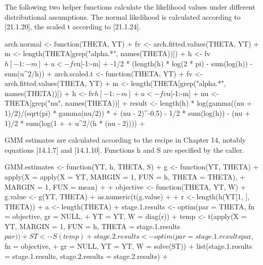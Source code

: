 \documentclass[a4paper]{article}
\begin{document}
The following two helper functions calculate the likelihood values under different distributional assumptions.
The normal likelihood is calculated according to [21.1.20], the scaled t according to [21.1.24].
\begin{Schunk}
\begin{Sinput}
 arch.normal <- function(THETA, YT) {
+     fv <- arch.fitted.values(THETA, YT)
+     m <- length(THETA[grep("alpha.*", names(THETA))])
+     h <- fv$h[-1:-m]
+     u <- fv$u[-1:-m]
+     -1/2 * (length(h) * log(2 * pi) - sum(log(h)) - sum(u^2/h))
+ }
 arch.scaled.t <- function(THETA, YT) {
+     fv <- arch.fitted.values(THETA, YT)
+     m <- length(THETA[grep("alpha.*", names(THETA))])
+     h <- fv$h[-1:-m]
+     u <- fv$u[-1:-m]
+     nu <- THETA[grep("nu", names(THETA))]
+     result <- length(h) * log(gamma((nu + 1)/2)/(sqrt(pi) * gamma(nu/2)) * 
+         (nu - 2)^-0.5) - 1/2 * sum(log(h)) - (nu + 1)/2 * sum(log(1 + 
+         u^2/(h * (nu - 2))))
+ }
\end{Sinput}
\end{Schunk}
GMM estimates are calculated according to the recipe in Chapter 14, notably
equations [14.1.7] and [14.1.10].  Functions h and S are specified
by the caller.
\begin{Schunk}
\begin{Sinput}
 GMM.estimates <- function(YT, h, THETA, S) {
+     g <- function(YT, THETA) {
+         apply(X = apply(X = YT, MARGIN = 1, FUN = h, THETA = THETA), 
+             MARGIN = 1, FUN = mean)
+     }
+     objective <- function(THETA, YT, W) {
+         g.value <- g(YT, THETA)
+         as.numeric(t(g.value) %
+     }
+     r <- length(h(YT[1, ], THETA))
+     a <- length(THETA)
+     stage.1.results <- optim(par = THETA, fn = objective, gr = NULL, 
+         YT = YT, W = diag(r))
+     temp <- t(apply(X = YT, MARGIN = 1, FUN = h, THETA = stage.1.results$par))
+     ST <- S(temp)
+     stage.2.results <- optim(par = stage.1.results$par, fn = objective, 
+         gr = NULL, YT = YT, W = solve(ST))
+     list(stage.1.results = stage.1.results, stage.2.results = stage.2.results)
+ }
\end{Sinput}
\end{Schunk}
\end{document}
